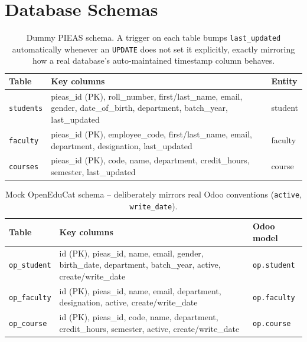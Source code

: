 \documentclass[11pt,a4paper]{article}
\begin{document}
\section{Database Schemas}

\begin{table}[H]
\centering
\small
\begin{tabular}{@{}p{2.0cm}p{9.4cm}p{1.6cm}@{}}
\toprule
\textbf{Table} & \textbf{Key columns} & \textbf{Entity} \\
\midrule
\texttt{students} & pieas\_id (PK), roll\_number, first/last\_name, email, gender,
date\_of\_birth, department, batch\_year, last\_updated & student \\
\texttt{faculty} & pieas\_id (PK), employee\_code, first/last\_name, email, department,
designation, last\_updated & faculty \\
\texttt{courses} & pieas\_id (PK), code, name, department, credit\_hours, semester,
last\_updated & course \\
\bottomrule
\end{tabular}
\caption{Dummy PIEAS schema. A trigger on each table bumps \texttt{last\_updated} automatically
whenever an \texttt{UPDATE} does not set it explicitly, exactly mirroring how a real database's
auto-maintained timestamp column behaves.}
\end{table}

\begin{table}[H]
\centering
\small
\begin{tabular}{@{}p{2.0cm}p{8.8cm}p{2.2cm}@{}}
\toprule
\textbf{Table} & \textbf{Key columns} & \textbf{Odoo model} \\
\midrule
\texttt{op\_student} & id (PK), pieas\_id, name, email, gender, birth\_date, department,
batch\_year, active, create/write\_date & \texttt{op.student} \\
\texttt{op\_faculty} & id (PK), pieas\_id, name, email, department, designation, active,
create/write\_date & \texttt{op.faculty} \\
\texttt{op\_course} & id (PK), pieas\_id, code, name, department, credit\_hours, semester,
active, create/write\_date & \texttt{op.course} \\
\bottomrule
\end{tabular}
\caption{Mock OpenEduCat schema -- deliberately mirrors real Odoo conventions (\texttt{active},
\texttt{write\_date}).}
\end{table}
\end{document}
